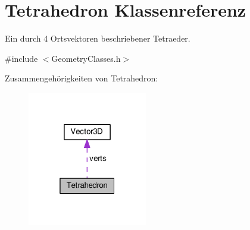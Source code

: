 \hypertarget{classTetrahedron}{\section{Tetrahedron Klassenreferenz}
\label{classTetrahedron}
}


Ein durch 4 Ortsvektoren beschriebener Tetraeder.  




{\ttfamily \#include $<$Geometry\-Classes.\-h$>$}



Zusammengehörigkeiten von Tetrahedron\-:
\nopagebreak
\begin{figure}[H]
\begin{center}
\leavevmode
\includegraphics[width=148pt]{classTetrahedron__coll__graph}
\end{center}
\end{figure}
